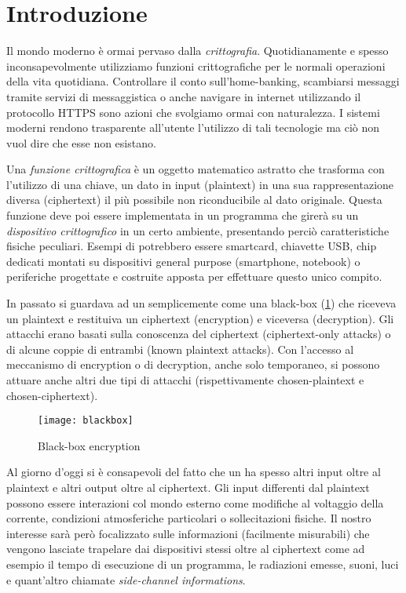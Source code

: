 \chapter*{Introduzione}
	Il mondo moderno è ormai pervaso dalla \emph{crittografia}. Quotidianamente e spesso inconsapevolmente utilizziamo funzioni crittografiche per le normali operazioni della vita quotidiana. Controllare il conto sull'home-banking, scambiarsi messaggi tramite servizi di messaggistica o anche navigare in internet utilizzando il protocollo \acs{HTTPS} sono azioni che svolgiamo ormai con naturalezza. I sistemi moderni rendono trasparente all'utente l'utilizzo di tali tecnologie ma ciò non vuol dire che esse non esistano.
	
	Una \emph{funzione crittografica} è un oggetto matematico astratto che trasforma con l'utilizzo di una chiave, un dato in input (plaintext) in una sua rappresentazione diversa (ciphertext) il più possibile non riconducibile al dato originale. Questa funzione deve poi essere implementata in un programma che girerà su un \emph{dispositivo crittografico} in un certo ambiente, presentando perciò caratteristiche fisiche peculiari. Esempi di \dispp potrebbero essere smartcard, chiavette \acs{USB}, chip dedicati montati su dispositivi general purpose (smartphone, notebook) o periferiche progettate e costruite apposta per effettuare questo unico compito.
	
	In passato si guardava ad un \disps semplicemente come una black-box (\cref{fig:blackbox}) che riceveva un plaintext e restituiva un ciphertext (encryption) e viceversa (decryption). Gli attacchi erano basati sulla conoscenza del ciphertext (ciphertext-only attacks) o di alcune coppie di entrambi (known plaintext attacks). Con l'accesso al meccanismo di encryption o di decryption, anche solo temporaneo, si possono attuare anche altri due tipi di attacchi (rispettivamente chosen-plaintext e chosen-ciphertext)\cite{dispenseCS}.
	
	\begin{figure}
		\begin{center}
			\texttt{[image: blackbox]}
			\caption{Black-box encryption}
			\label{fig:blackbox}
		\end{center}
	\end{figure}
	
	Al giorno d'oggi si è consapevoli del fatto che un \disps ha spesso altri input oltre al plaintext e altri output oltre al ciphertext. Gli input differenti dal plaintext possono essere interazioni col mondo esterno come modifiche al voltaggio della corrente, condizioni atmosferiche particolari o sollecitazioni fisiche. Il nostro interesse sarà però focalizzato sulle informazioni (facilmente misurabili) che vengono lasciate trapelare dai dispositivi stessi oltre al ciphertext come ad esempio il tempo di esecuzione di un programma, le radiazioni emesse, suoni, luci e quant'altro chiamate \emph{side-channel informations}.
	 
